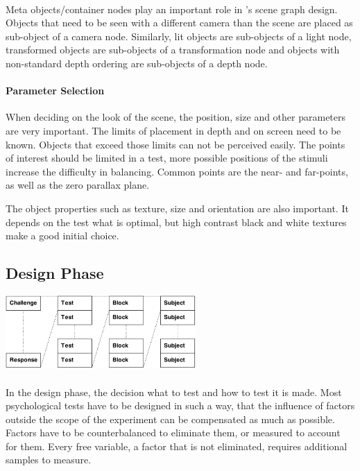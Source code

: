 \paragraph{}
Meta objects/container nodes play an important role in \ER's scene graph design.
Objects that need to be seen with a different camera than the scene are placed as sub-object of a camera node.
Similarly, lit objects are sub-objects of a light node, transformed objects are sub-objects of a transformation node and objects with non-standard depth ordering are sub-objects of a depth node.

\paragraph{Parameter Selection}
When deciding on the look of the scene, the position, size and other parameters are very important.
The limits of placement in depth and on screen need to be known. Objects that exceed those limits can not be perceived easily.
The points of interest should be limited in a test, more possible positions of the stimuli increase the difficulty in balancing.
Common points are the near- and far-points, as well as the zero parallax plane.

The object properties such as texture, size and orientation are also important.
It depends on the test what is optimal, but high contrast black and white textures make a good initial choice.


\subsection{Design Phase}

\begin{center}
\includegraphics[width=7.25cm]{media/test.pdf}
\end{center}

\paragraph{}
In the design phase, the decision what to test and how to test it is made.
Most psychological tests have to be designed in such a way, that the influence of factors outside the scope of the experiment can be compensated as much as possible.
Factors have to be counterbalanced to eliminate them,
or measured to account for them.
Every free variable, a factor that is not eliminated, requires additional samples to measure.

